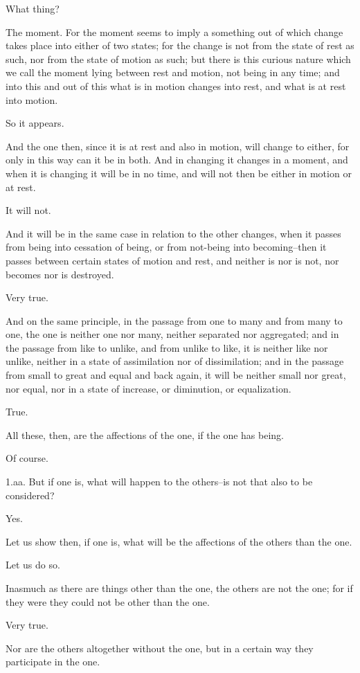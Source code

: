 What thing?

The moment. For the moment seems to imply a something out of which
change takes place into either of two states; for the change is not from
the state of rest as such, nor from the state of motion as such; but
there is this curious nature which we call the moment lying between rest
and motion, not being in any time; and into this and out of this what is
in motion changes into rest, and what is at rest into motion.

So it appears.

And the one then, since it is at rest and also in motion, will change
to either, for only in this way can it be in both. And in changing it
changes in a moment, and when it is changing it will be in no time, and
will not then be either in motion or at rest.

It will not.

And it will be in the same case in relation to the other changes, when
it passes from being into cessation of being, or from not-being into
becoming--then it passes between certain states of motion and rest, and
neither is nor is not, nor becomes nor is destroyed.

Very true.

And on the same principle, in the passage from one to many and from
many to one, the one is neither one nor many, neither separated nor
aggregated; and in the passage from like to unlike, and from unlike to
like, it is neither like nor unlike, neither in a state of assimilation
nor of dissimilation; and in the passage from small to great and equal
and back again, it will be neither small nor great, nor equal, nor in a
state of increase, or diminution, or equalization.

True.

All these, then, are the affections of the one, if the one has being.

Of course.

1.aa. But if one is, what will happen to the others--is not that also to
be considered?

Yes.

Let us show then, if one is, what will be the affections of the others
than the one.

Let us do so.

Inasmuch as there are things other than the one, the others are not the
one; for if they were they could not be other than the one.

Very true.

Nor are the others altogether without the one, but in a certain way they
participate in the one.

